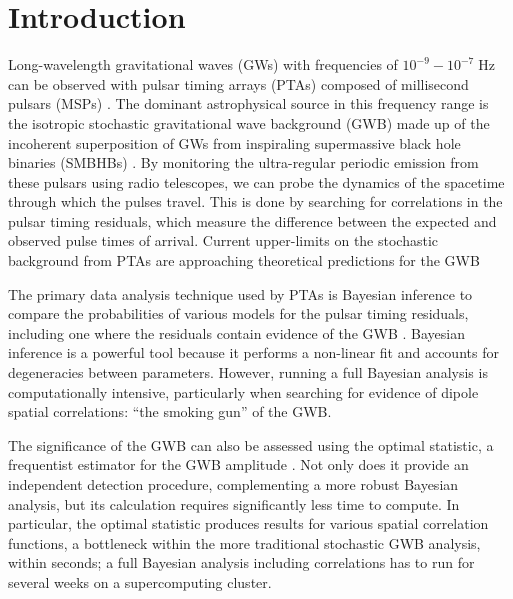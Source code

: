 \documentclass[twocolumn,aps,prd,superscriptaddress]{revtex4-1}
\begin{document}
\maketitle


\section{Introduction}

Long-wavelength gravitational waves (GWs) with frequencies of 
$10^{-9} - 10^{-7} \; \mathrm{Hz}$ can be observed with pulsar timing arrays (PTAs) 
composed of millisecond pulsars (MSPs) \cite{hd1983,fb1990}. 
The dominant astrophysical source in this frequency range is the isotropic stochastic 
gravitational wave background (GWB) 
made up of the incoherent superposition of GWs from inspiraling 
supermassive black hole binaries (SMBHBs) 
\citep{1995ApJ...446..543R, 2003ApJ...583..616J, 2003ApJ...590..691W}. 
By monitoring the ultra-regular periodic emission from these pulsars using radio telescopes, 
we can probe the dynamics of the spacetime through which the pulses travel. 
This is done by searching for correlations in the pulsar timing residuals, 
which measure the difference between the expected and observed pulse times of arrival. 
Current upper-limits on the stochastic background from PTAs are approaching 
theoretical predictions for the GWB \citep{PPTA2013,EPTA2015,abb+17b}

The primary data analysis technique used by PTAs is Bayesian inference 
to compare the probabilities of various models for the pulsar timing residuals, 
including one where the residuals contain evidence of the GWB 
\citep{vlm+2009,lah+2013}. 
Bayesian inference is a powerful tool because 
it performs a non-linear fit and 
accounts for degeneracies between parameters. 
However, running a full Bayesian analysis is computationally intensive, 
particularly when searching for evidence of dipole spatial correlations:
``the smoking gun'' of the GWB.

The significance of the GWB can also be assessed using the 
optimal statistic, a frequentist estimator for the GWB amplitude \citep{abc+2009,demorest+2013,ccs+2015}. 
Not only does it provide an independent detection procedure, complementing a more robust Bayesian analysis, but its calculation requires significantly less time to compute. In particular, the optimal statistic produces results for various spatial correlation functions, a bottleneck within the more traditional stochastic GWB analysis, within seconds; a full Bayesian analysis including correlations has to run for several weeks on a supercomputing cluster. 
\end{document}

